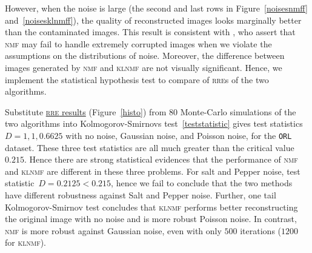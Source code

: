 However, when the noise is large (the second and last rows in Figure~\ref{noisesnmff} and~\ref{noisesklnmff}), the quality of reconstructed images looks marginally better than the contaminated images.
This result is consistent with \citet{guan2017truncated}, who assert that \textsc{nmf} may fail to handle extremely corrupted images when we violate the assumptions on the distributions of noise.
Moreover, the difference between images generated by \textsc{nmf} and \textsc{klnmf} are not visually significant.
Hence, we implement the statistical hypothesis test to compare of \textsc{rre}s of the two algorithms.

Substitute \href{https://raw.githubusercontent.com/JoyceXinyueWang/nmf_raw_data/master/raw_result_acc.csv}{\textsc{rre} results} (Figure~\ref{histo}) from $80$ Monte-Carlo simulations of the two algorithms into Kolmogorov-Smirnovs test~\eqref{teststatistic} gives test statistics~$D=1, 1 ,0.6625$ with no noise, Gaussian noise, and Poisson noise, for the \texttt{ORL} dataset. These three test statistics are all much greater than the critical value~$0.215$. Hence there are strong statistical evidences that the performance of \textsc{nmf} and \textsc{klnmf} are different in these three problems. For salt and Pepper noise, test statistic~$D=0.2125<0.215$, hence we fail to conclude that the two methods have different robustness against Salt and Pepper noise. Further, one tail Kolmogorov-Smirnov test concludes that \textsc{klnmf} performs better reconstructing the original image with no noise and is more robust Poisson noise. 
In contrast, \textsc{nmf} is more robust against Gaussian noise, even with only $500$ iterations ($1200$ for \textsc{klnmf}).
